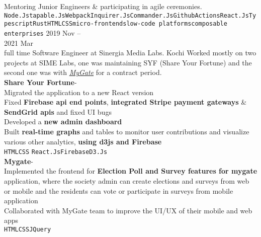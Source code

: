 \documentclass[9pt]{developercv} %
\begin{document}
\begin{entrylist}
{			\faCaretRight\: Mentoring Junior Engineers \& participating in agile ceremonies.\\
			\texttt{Node.Js}\slashsep\texttt{tapable.Js}\slashsep\texttt{Webpack}\slashsep\texttt{Inquirer.Js}\slashsep\texttt{Commander.Js}\slashsep\texttt{GithubActions}\slashsep\texttt{React.Js}\slashsep\texttt{Typescript}\slashsep\texttt{Rust}\slashsep\texttt{HTML}\slashsep\texttt{CSS}\slashsep\texttt{micro-frontends}\slashsep\texttt{low-code platforms}\slashsep\texttt{composable enterprises}
		}
	\entry
		{2019 Nov --\\ 2021 Mar\\\footnotesize{full time}}
		{Software Engineer}
		{at}
		{Sinergia Media Labs.}
		{Kochi}
		{
			Worked mostly on two projects at SIME Labs, one was maintaining SYF (Share Your Fortune) and the second one was with \href{https://www.mygate.com/}{\emph{MyGate}} for a contract period.\smallskip\\
			\textbf{Share Your Fortune}\;-\;{\footnotesize\textcolor{darkgray}{crowdfunding website for social causes.}}\\
  				\faCaretRight\:Migrated the application to a new React version\\
  				\faCaretRight\:Fixed \textbf{Firebase api end points}, \textbf{integrated Stripe payment gateways} \& \textbf{SendGrid apis} and fixed UI bugs\\
  				\faCaretRight\: Developed a \textbf{new admin dashboard}\\
				\faCaretRight\: Built \textbf{real-time graphs} and tables to monitor user contributions and visualize various other analytics, \textbf{using d3js and Firebase}\\
			\texttt{HTML}\slashsep\texttt{CSS}
			\slashsep\texttt{React.Js}\slashsep\texttt{Firebase}\slashsep\texttt{D3.Js}\smallskip\\
			\textbf{Mygate}\;-\;{\footnotesize\textcolor{darkgray}{Security and community management solutions for gated communities.}}\\
  				\faCaretRight\: Implemented the frontend for \textbf{Election Poll and Survey features for mygate} application, where the society admin can create elections and surveys from web or mobile and the residents can vote or participate in surveys from mobile application \\
			\faCaretRight\: Collaborated with MyGate team to improve the UI/UX of their mobile and web apps\\
			\texttt{HTML}\slashsep\texttt{CSS}\slashsep\texttt{JQuery}
		}
\end{entrylist}
\end{document}
